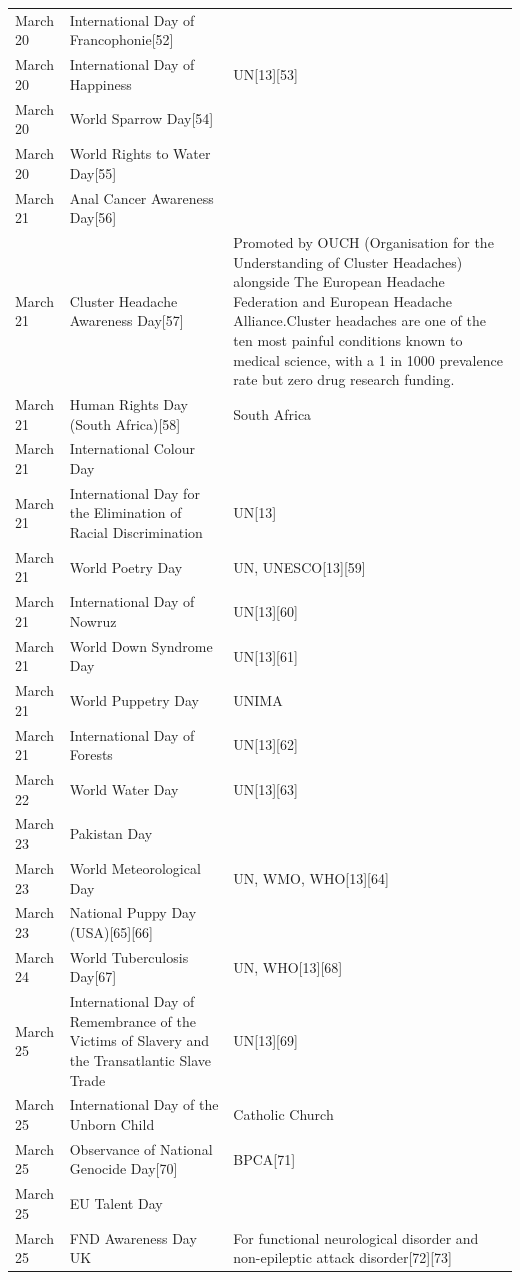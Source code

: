 \documentclass[
]{book}
\begin{document}
\begin{longtable}[t]{>{\raggedright\arraybackslash}p{8em}>{\raggedright\arraybackslash}p{20em}>{\raggedright\arraybackslash}p{12em}}
March 20 & International Day of Francophonie[52] & \\
March 20 & International Day of Happiness & UN[13][53]\\
March 20 & World Sparrow Day[54] & \\
\addlinespace
March 20 & World Rights to Water Day[55] & \\
March 21 & Anal Cancer Awareness Day[56] & \\
March 21 & Cluster Headache Awareness Day[57] & Promoted by OUCH (Organisation for the Understanding of Cluster Headaches) alongside The European Headache Federation and European Headache Alliance.Cluster headaches are one of the ten most painful conditions known to medical science, with a 1 in 1000 prevalence rate but zero drug research funding.\\
March 21 & Human Rights Day (South Africa)[58] & South Africa\\
March 21 & International Colour Day & \\
\addlinespace
March 21 & International Day for the Elimination of Racial Discrimination & UN[13]\\
March 21 & World Poetry Day & UN, UNESCO[13][59]\\
March 21 & International Day of Nowruz & UN[13][60]\\
March 21 & World Down Syndrome Day & UN[13][61]\\
March 21 & World Puppetry Day & UNIMA\\
\addlinespace
March 21 & International Day of Forests & UN[13][62]\\
March 22 & World Water Day & UN[13][63]\\
March 23 & Pakistan Day & \\
March 23 & World Meteorological Day & UN, WMO, WHO[13][64]\\
March 23 & National Puppy Day (USA)[65][66] & \\
\addlinespace
March 24 & World Tuberculosis Day[67] & UN, WHO[13][68]\\
March 25 & International Day of Remembrance of the Victims of Slavery and the Transatlantic Slave Trade & UN[13][69]\\
March 25 & International Day of the Unborn Child & Catholic Church\\
March 25 & Observance of National Genocide Day[70] & BPCA[71]\\
March 25 & EU Talent Day & \\
\addlinespace
March 25 & FND Awareness Day UK & For functional neurological disorder and non-epileptic attack disorder[72][73]\\

\end{longtable}
\end{document}
